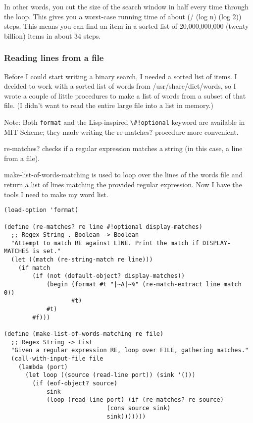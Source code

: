 \documentclass[12pt,openright,draft]{book}
\begin{document}
In other words, you cut the size of the search window in half every
time through the loop. This gives you a worst-case running time of
about (/ (log n) (log 2)) steps. This means you can find an item in a
sorted list of 20,000,000,000 (twenty billion) items in about 34
steps.

\subsubsection{Reading lines from a file}

Before I could start writing a binary search, I needed a sorted list
of items. I decided to work with a sorted list of words from
/usr/share/dict/words, so I wrote a couple of little procedures to
make a list of words from a subset of that file. (I didn't want to
read the entire large file into a list in memory.)

Note: Both \verb|format| and the Lisp-inspired \verb|\#!optional|
keyword are available in MIT Scheme; they made writing the re-matches?
procedure more convenient.

re-matches? checks if a regular expression matches a string (in this
case, a line from a file).

make-list-of-words-matching is used to loop over the lines of the
words file and return a list of lines matching the provided regular
expression.  Now I have the tools I need to make my word list.

\begin{verbatim}
(load-option 'format)

(define (re-matches? re line #!optional display-matches)
  ;; Regex String . Boolean -> Boolean
  "Attempt to match RE against LINE. Print the match if DISPLAY-MATCHES is set."
  (let ((match (re-string-match re line)))
    (if match
        (if (not (default-object? display-matches))
            (begin (format #t "|~A|~%" (re-match-extract line match 0))
                   #t)
            #t)
        #f)))

(define (make-list-of-words-matching re file)
  ;; Regex String -> List
  "Given a regular expression RE, loop over FILE, gathering matches."
  (call-with-input-file file
    (lambda (port)
      (let loop ((source (read-line port)) (sink '()))
        (if (eof-object? source)
            sink
            (loop (read-line port) (if (re-matches? re source)
                             (cons source sink)
                             sink)))))))
\end{verbatim}
\end{document}
